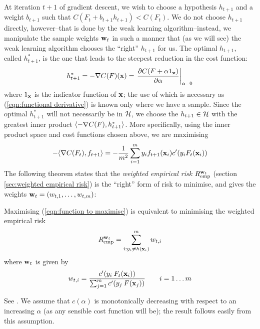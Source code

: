 At iteration $t+1$ of gradient descent, we wish to choose a hypothesis
$h_{t+1}$ and a weight $b_{t+1}$ such that $C(F_t + b_{t+1} h_{t+1}) <
C(F_t)$.  We do not choose $h_{t+1}$ directly, however--that is done by
the weak learning algorithm--instead, we manipulate the sample weights
$\mathbf{w}_t$ in such a manner that (as we will see) the weak learning
algorithm chooses the ``right'' $h_{t+1}$ for us.  The optimal $h_{t+1}$,
called $h_{t+1}^{\ast}$, is the one that leads to the steepest reduction
in the cost function: 
%
\begin{equation}
h_{t+1}^{\ast} = -\nabla C(F)(\mathbf{x}) = \left. \frac{\partial C(F + \alpha
1_{\mathbf{x}})}{\partial \alpha} \right|_{\alpha = 0}
\label{eqn:functional derivative}
\end{equation}
%
where $1_{\mathbf{x}}$ is the indicator function of $\mathbf{x}$; the use of which
is necessary as (\ref{eqn:functional derivative}) is known only where
we have a sample.  Since the optimal $h_{t+1}^{\ast}$ will not necessarily
be in $\mathcal{H}$, we choose the $h_{t+1} \in \mathcal{H}$ with the greatest inner
product $\langle {-\nabla C(F)} , {h_{t+1}^{\ast}} \rangle$.  More specifically, using the
inner product space and cost functions chosen above, we are maximising 
%
\begin{equation}
- \langle {\nabla C(F_t)} , {f_{t+1}} \rangle = - \frac{1}{m^2} \sum_{i=1}^{m} y_i
  f_{t+1}(\mathbf{x}_i)  c'(y_i F_t(\mathbf{x}_i))
\label{eqn:function to maximise}
\end{equation}
%
The following theorem states that the \emph{weighted empirical risk}
$R_{\mathrm{emp}}^{\mathbf{w}_t}$ (section \ref{sec:weighted empirical risk}) is
the ``right'' form of risk to minimise, and gives the weights
$\mathbf{w}_t = (w_{t,1}, \ldots, w_{t,m})$:

\begin{theorem}
\label{thm:gradient descent weights and direction}
Maximising (\ref{eqn:function to maximise}) is equivalent to
minimising the weighted empirical risk
%
\begin{equation}
R_{\mathrm{emp}}^{\mathbf{w}_t} = \sum_{i:y_i \neq h(\mathbf{x}_i)}^{m} w_{t,i}
\end{equation}
%
where $\mathbf{w}_{t}$ is given by
%
\begin{equation}
w_{t,i} = \frac{c'(y_i \: F_t (\mathbf{x}_i))}{\sum_{j=1}^{m} c'(y_j \:
F(\mathbf{x}_j))} \qquad i=1 \ldots m
\label{eqn:gradient sample weights}
\end{equation}
\end{theorem}
\proof See \cite{Mason99}.  We assume that $c(\alpha)$ is
monotonically decreasing with respect to an increasing $\alpha$ (as
any sensible cost function will be); the result follows easily from this
assumption.

